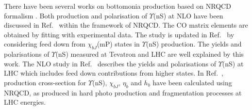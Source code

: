 There have been several works on bottomonia production based on
NRQCD formalism \cite{Domenech:1999qg,Domenech:2000ri,Braaten:2000cm,Gong:2010bk,Sharma:2012dy}.
Both production and polarisation of $\Upsilon$(nS) at NLO have been discussed in 
Ref.~\cite{Gong:2013qka} within the framework of NRQCD. The CO matrix elements are obtained
by fitting with experimental data. The study is updated in Ref.~\cite{Feng:2015wka} by considering
feed down from $\chi_{bJ}$(mP) states in $\Upsilon$(nS) production. The yields and
polarisations of $\Upsilon$(nS) measured at Tevatron and LHC are well explained by this work.
The NLO study in Ref.~\cite{Han:2014kxa} describes the yields and polarisations of
$\Upsilon$(nS) at LHC which includes feed down contributions from
higher states. In Ref.~\cite{Yu:2017pot}, production cross-section for $\Upsilon$(nS),
$\chi_{bJ}$, $\eta_b$ and $h_b$ have been calculated using NRQCD, as produced in hard
photo production and fragmentation processes at LHC energies. 


